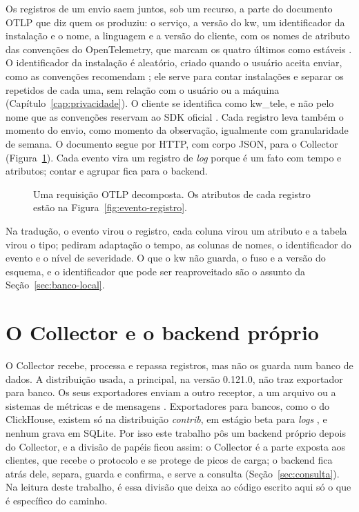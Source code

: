 Os registros de um envio saem juntos, sob um recurso, a parte do documento OTLP
que diz quem os produziu: o serviço, a versão do kw, um identificador da
instalação e o nome, a linguagem e a versão do cliente, com os nomes de
atributo das convenções do OpenTelemetry, que marcam os quatro últimos como
estáveis \citep{otel_semconv_resource_v1_45_0}. O identificador da instalação é
aleatório, criado quando o usuário aceita enviar, como as convenções
recomendam \citep{otel_semconv_registry_service_v1_45_0}; ele serve para contar
instalações e separar os repetidos de cada uma, sem relação com o usuário ou a
máquina (Capítulo~\ref{cap:privacidade}). O cliente se identifica como
kw\_tele, e não pelo nome que as convenções reservam ao SDK oficial
\citep{otel_semconv_resource_v1_45_0}. Cada registro leva também o momento do
envio, como momento da observação, igualmente com granularidade de semana. O documento segue por HTTP, com corpo JSON, para o Collector
(Figura~\ref{fig:requisicao-otlp}). Cada evento vira um
registro de \textit{log} porque é um fato com tempo e atributos; contar e
agrupar fica para o backend.

\begin{figure}[!ht]
  \centering
  
  \caption{Uma requisição OTLP decomposta. Os atributos de cada registro estão
    na Figura~\ref{fig:evento-registro}.}
  \label{fig:requisicao-otlp}
\end{figure}

Na tradução, o evento virou o registro, cada coluna virou um atributo e a
tabela virou o tipo; pediram adaptação o tempo, as colunas de nomes, o
identificador do evento e o nível de severidade. O que o kw não guarda, o fuso
e a versão do esquema, e o identificador que pode ser reaproveitado são o
assunto da Seção~\ref{sec:banco-local}.

\section{O Collector e o backend próprio}
\label{sec:backend}

O Collector recebe, processa e repassa registros, mas não os guarda num banco
de dados. A distribuição usada, a principal, na versão 0.121.0, não traz
exportador para banco. Os seus exportadores enviam a outro receptor, a um
arquivo ou a sistemas de métricas e de mensagens
\citep{otelcol_releases_manifest_0_121_0}. Exportadores para bancos, como o do
ClickHouse, existem só na distribuição \textit{contrib}, em estágio beta para
\textit{logs} \citep{otelcol_contrib_clickhouse_metadata_0_121_0}, e nenhum
grava em SQLite. Por isso este trabalho pôs um backend próprio depois do
Collector, e a divisão de papéis ficou assim: o Collector é a parte exposta
aos clientes, que recebe o protocolo e se protege de picos de carga; o backend
fica atrás dele, separa, guarda e confirma, e serve a consulta
(Seção~\ref{sec:consulta}). Na leitura deste trabalho, é essa divisão que
deixa ao código escrito aqui só o que é específico do caminho.

